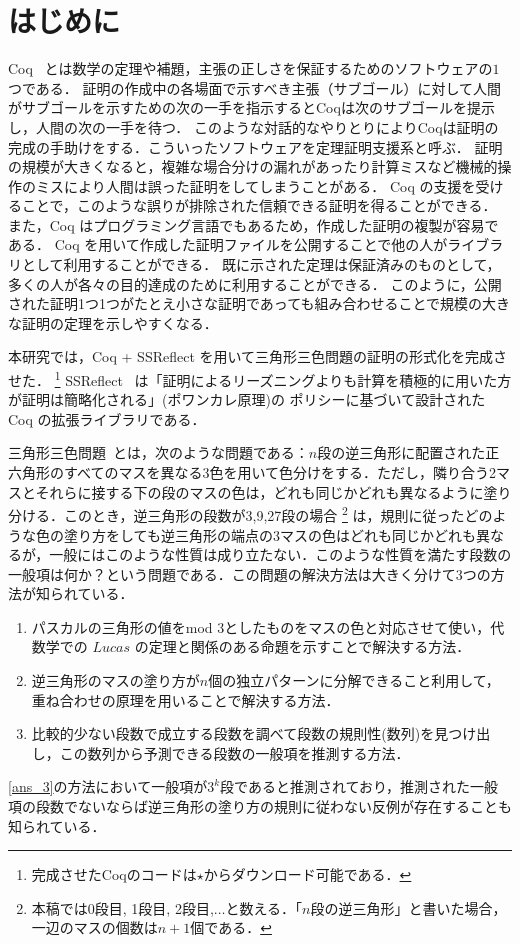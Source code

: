 \section{はじめに}
Coq~\cite{Coq} とは数学の定理や補題，主張の正しさを保証するためのソフトウェアの$1$つである．
証明の作成中の各場面で示すべき主張（サブゴール）に対して人間がサブゴールを示すための次の一手を指示するとCoqは次のサブゴールを提示し，人間の次の一手を待つ．
このような対話的なやりとりによりCoqは証明の完成の手助けをする．こういったソフトウェアを定理証明支援系と呼ぶ．
証明の規模が大きくなると，複雑な場合分けの漏れがあったり計算ミスなど機械的操作のミスにより人間は誤った証明をしてしまうことがある．
Coq の支援を受けることで，このような誤りが排除された信頼できる証明を得ることができる．
また，Coq はプログラミング言語でもあるため，作成した証明の複製が容易である．
Coq を用いて作成した証明ファイルを公開することで他の人がライブラリとして利用することができる．
既に示された定理は保証済みのものとして，多くの人が各々の目的達成のために利用することができる．
このように，公開された証明1つ1つがたとえ小さな証明であっても組み合わせることで規模の大きな証明の定理を示しやすくなる．

本研究では，Coq + SSReflect を用いて三角形三色問題の証明の形式化を完成させた．
\footnote{
  完成させたCoqのコードは$\star$からダウンロード可能である．
}
SSReflect~\cite{SSReflect,CoqBook} は「証明によるリーズニングよりも計算を積極的に用いた方が証明は簡略化される」(ポワンカレ原理)の
ポリシーに基づいて設計された Coq の拡張ライブラリである．

三角形三色問題~\cite{Nishiyama1,Nishiyama2,Nishiyama3}とは，次のような問題である：$n$段の逆三角形に配置された正六角形のすべてのマスを異なる3色を用いて色分けをする．ただし，隣り合う2マスとそれらに接する下の段のマスの色は，どれも同じかどれも異なるように塗り分ける．このとき，逆三角形の段数が3,9,27段の場合 \footnote{本稿では0段目, 1段目, 2段目,$\ldots$と数える．「$n$段の逆三角形」と書いた場合，一辺のマスの個数は$n+1$個である．} は，規則に従ったどのような色の塗り方をしても逆三角形の端点の3マスの色はどれも同じかどれも異なるが，一般にはこのような性質は成り立たない．このような性質を満たす段数の一般項は何か？という問題である．この問題の解決方法は大きく分けて3つの方法が知られている．\cite{Nishiyama1}
\begin{enumerate}
\item \label{ans_1}
  パスカルの三角形の値をmod $3$としたものをマスの色と対応させて使い，代数学での $Lucas$ の定理と関係のある命題を示すことで解決する方法．
\item \label{ans_2}
  逆三角形のマスの塗り方が$n$個の独立パターンに分解できること利用して，重ね合わせの原理を用いることで解決する方法．
\item \label{ans_3}
  比較的少ない段数で成立する段数を調べて段数の規則性(数列)を見つけ出し，この数列から予測できる段数の一般項を推測する方法．
\end{enumerate}
\ref{ans_3}の方法において一般項が$3^k$段であると推測されており，推測された一般項の段数でないならば逆三角形の塗り方の規則に従わない反例が存在することも知られている．

